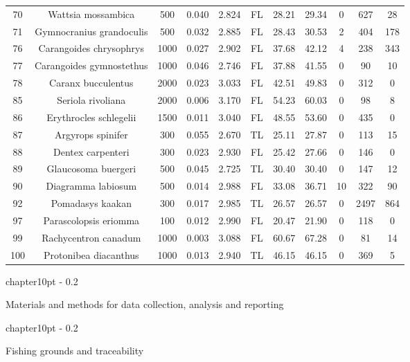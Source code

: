 \documentclass{report}\usepackage[]{graphicx}\usepackage[]{color}
\makeatletter
\renewcommand\chapter{\@startsection%
{chapter}{1}{0pt}%
{-\baselineskip}%
{0.2\baselineskip}%
{\raggedright\bf}}%
\makeatother
\begin{document}
\begin{table}[ht]
{\begin{tabular}{ccccccccccc}
  70 & Wattsia mossambica & 500 & 0.040 & 2.824 & FL & 28.21 & 29.34 & 0 & 627 & 28 \\ 
  71 & Gymnocranius grandoculis & 500 & 0.032 & 2.885 & FL & 28.43 & 30.53 & 2 & 404 & 178 \\ 
  76 & Carangoides chrysophrys & 1000 & 0.027 & 2.902 & FL & 37.68 & 42.12 & 4 & 238 & 343 \\ 
  77 & Carangoides gymnostethus & 1000 & 0.046 & 2.746 & FL & 37.88 & 41.55 & 0 & 90 & 10 \\ 
  78 & Caranx bucculentus & 2000 & 0.023 & 3.033 & FL & 42.51 & 49.83 & 0 & 312 & 0 \\ 
  85 & Seriola rivoliana & 2000 & 0.006 & 3.170 & FL & 54.23 & 60.03 & 0 & 98 & 8 \\ 
  86 & Erythrocles schlegelii & 1500 & 0.011 & 3.040 & FL & 48.55 & 53.60 & 0 & 435 & 0 \\ 
  87 & Argyrops spinifer & 300 & 0.055 & 2.670 & TL & 25.11 & 27.87 & 0 & 113 & 15 \\ 
  88 & Dentex carpenteri & 300 & 0.023 & 2.930 & FL & 25.42 & 27.66 & 0 & 146 & 0 \\ 
  89 & Glaucosoma buergeri & 500 & 0.045 & 2.725 & TL & 30.40 & 30.40 & 0 & 147 & 12 \\ 
  90 & Diagramma labiosum & 500 & 0.014 & 2.988 & FL & 33.08 & 36.71 & 10 & 322 & 90 \\ 
  92 & Pomadasys kaakan & 300 & 0.017 & 2.985 & TL & 26.57 & 26.57 & 0 & 2497 & 864 \\ 
  97 & Parascolopsis eriomma & 100 & 0.012 & 2.990 & FL & 20.47 & 21.90 & 0 & 118 & 0 \\ 
  99 & Rachycentron canadum & 1000 & 0.003 & 3.088 & FL & 60.67 & 67.28 & 0 & 81 & 14 \\ 
  100 & Protonibea diacanthus & 1000 & 0.013 & 2.940 & TL & 46.15 & 46.15 & 0 & 369 & 5 \\ 
   \hline
\end{tabular}
}
\end{table}

\clearpage
\newpage

\chapter{Materials and methods for data collection, analysis and reporting}


\newpage

\chapter{Fishing grounds and traceability}

\end{document}
